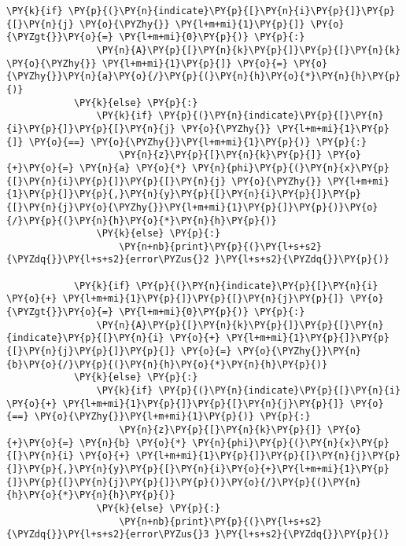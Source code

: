 \begin{tcolorbox}[breakable, size=fbox, boxrule=1pt, pad at break*=1mm,colback=cellbackground, colframe=cellborder]
\begin{Verbatim}[commandchars=\\\{\}]
            \PY{k}{if} \PY{p}{(}\PY{n}{indicate}\PY{p}{[}\PY{n}{i}\PY{p}{]}\PY{p}{[}\PY{n}{j} \PY{o}{\PYZhy{}} \PY{l+m+mi}{1}\PY{p}{]} \PY{o}{\PYZgt{}}\PY{o}{=} \PY{l+m+mi}{0}\PY{p}{)} \PY{p}{:}
                \PY{n}{A}\PY{p}{[}\PY{n}{k}\PY{p}{]}\PY{p}{[}\PY{n}{k} \PY{o}{\PYZhy{}} \PY{l+m+mi}{1}\PY{p}{]} \PY{o}{=} \PY{o}{\PYZhy{}}\PY{n}{a}\PY{o}{/}\PY{p}{(}\PY{n}{h}\PY{o}{*}\PY{n}{h}\PY{p}{)}
            \PY{k}{else} \PY{p}{:}    
                \PY{k}{if} \PY{p}{(}\PY{n}{indicate}\PY{p}{[}\PY{n}{i}\PY{p}{]}\PY{p}{[}\PY{n}{j} \PY{o}{\PYZhy{}} \PY{l+m+mi}{1}\PY{p}{]} \PY{o}{==} \PY{o}{\PYZhy{}}\PY{l+m+mi}{1}\PY{p}{)} \PY{p}{:}
                    \PY{n}{z}\PY{p}{[}\PY{n}{k}\PY{p}{]} \PY{o}{+}\PY{o}{=} \PY{n}{a} \PY{o}{*} \PY{n}{phi}\PY{p}{(}\PY{n}{x}\PY{p}{[}\PY{n}{i}\PY{p}{]}\PY{p}{[}\PY{n}{j} \PY{o}{\PYZhy{}} \PY{l+m+mi}{1}\PY{p}{]}\PY{p}{,}\PY{n}{y}\PY{p}{[}\PY{n}{i}\PY{p}{]}\PY{p}{[}\PY{n}{j}\PY{o}{\PYZhy{}}\PY{l+m+mi}{1}\PY{p}{]}\PY{p}{)}\PY{o}{/}\PY{p}{(}\PY{n}{h}\PY{o}{*}\PY{n}{h}\PY{p}{)}
                \PY{k}{else} \PY{p}{:}
                    \PY{n+nb}{print}\PY{p}{(}\PY{l+s+s2}{\PYZdq{}}\PY{l+s+s2}{error\PYZus{}2 }\PY{l+s+s2}{\PYZdq{}}\PY{p}{)}   
                    
            \PY{k}{if} \PY{p}{(}\PY{n}{indicate}\PY{p}{[}\PY{n}{i} \PY{o}{+} \PY{l+m+mi}{1}\PY{p}{]}\PY{p}{[}\PY{n}{j}\PY{p}{]} \PY{o}{\PYZgt{}}\PY{o}{=} \PY{l+m+mi}{0}\PY{p}{)} \PY{p}{:}
                \PY{n}{A}\PY{p}{[}\PY{n}{k}\PY{p}{]}\PY{p}{[}\PY{n}{indicate}\PY{p}{[}\PY{n}{i} \PY{o}{+} \PY{l+m+mi}{1}\PY{p}{]}\PY{p}{[}\PY{n}{j}\PY{p}{]}\PY{p}{]} \PY{o}{=} \PY{o}{\PYZhy{}}\PY{n}{b}\PY{o}{/}\PY{p}{(}\PY{n}{h}\PY{o}{*}\PY{n}{h}\PY{p}{)}
            \PY{k}{else} \PY{p}{:}
                \PY{k}{if} \PY{p}{(}\PY{n}{indicate}\PY{p}{[}\PY{n}{i} \PY{o}{+} \PY{l+m+mi}{1}\PY{p}{]}\PY{p}{[}\PY{n}{j}\PY{p}{]} \PY{o}{==} \PY{o}{\PYZhy{}}\PY{l+m+mi}{1}\PY{p}{)} \PY{p}{:}
                    \PY{n}{z}\PY{p}{[}\PY{n}{k}\PY{p}{]} \PY{o}{+}\PY{o}{=} \PY{n}{b} \PY{o}{*} \PY{n}{phi}\PY{p}{(}\PY{n}{x}\PY{p}{[}\PY{n}{i} \PY{o}{+} \PY{l+m+mi}{1}\PY{p}{]}\PY{p}{[}\PY{n}{j}\PY{p}{]}\PY{p}{,}\PY{n}{y}\PY{p}{[}\PY{n}{i}\PY{o}{+}\PY{l+m+mi}{1}\PY{p}{]}\PY{p}{[}\PY{n}{j}\PY{p}{]}\PY{p}{)}\PY{o}{/}\PY{p}{(}\PY{n}{h}\PY{o}{*}\PY{n}{h}\PY{p}{)}
                \PY{k}{else} \PY{p}{:}
                    \PY{n+nb}{print}\PY{p}{(}\PY{l+s+s2}{\PYZdq{}}\PY{l+s+s2}{error\PYZus{}3 }\PY{l+s+s2}{\PYZdq{}}\PY{p}{)} 
                    

\end{Verbatim}
\end{tcolorbox}
